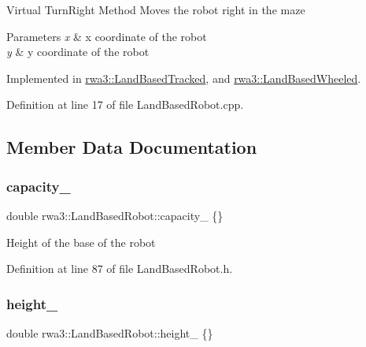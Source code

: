 Virtual Turn\+Right Method Moves the robot right in the maze 
\begin{DoxyParams}{Parameters}
{\em x} & x coordinate of the robot \\
\hline
{\em y} & y coordinate of the robot \\
\hline
\end{DoxyParams}


Implemented in \hyperlink{classrwa3_1_1_land_based_tracked_a5f6a5b1871d9f75d8a724b8d7ae44d1f}{rwa3\+::\+Land\+Based\+Tracked}, and \hyperlink{classrwa3_1_1_land_based_wheeled_a90d9a8735197a7647f508c1983191590}{rwa3\+::\+Land\+Based\+Wheeled}.



Definition at line 17 of file Land\+Based\+Robot.\+cpp.



\subsection{Member Data Documentation}
\mbox{\label{classrwa3_1_1_land_based_robot_aa717b15025b339a0f40f689452a97cf8}} 
\subsubsection{\texorpdfstring{capacity\+\_\+}{capacity\_}}
{\footnotesize\ttfamily double rwa3\+::\+Land\+Based\+Robot\+::capacity\+\_\+ \{\}\hspace{0.3cm}{\ttfamily [protected]}}

Height of the base of the robot 

Definition at line 87 of file Land\+Based\+Robot.\+h.

\mbox{\label{classrwa3_1_1_land_based_robot_a1187f7a4fd44450abf81a1ad76f18f72}} 
\subsubsection{\texorpdfstring{height\+\_\+}{height\_}}
{\footnotesize\ttfamily double rwa3\+::\+Land\+Based\+Robot\+::height\+\_\+ \{\}\hspace{0.3cm}{\ttfamily [protected]}}

